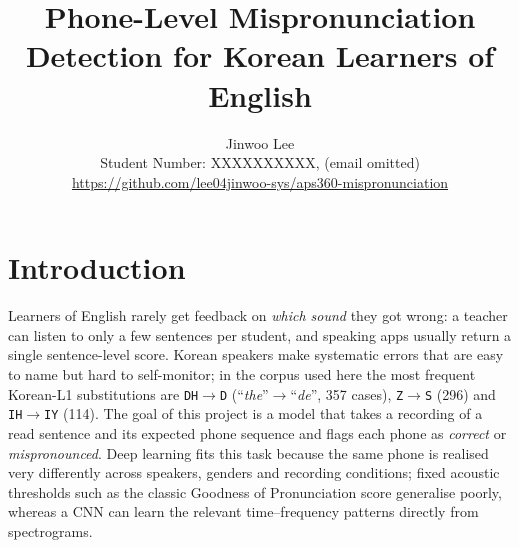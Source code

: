 \documentclass[final]{article}
\title{Phone-Level Mispronunciation Detection for Korean Learners of English}
\author{%
  Jinwoo Lee \\
  Student Number: XXXXXXXXXX, (email omitted)\\
  \url{https://github.com/lee04jinwoo-sys/aps360-mispronunciation}\\
}
\begin{document}
\maketitle

\vspace{-0.5in}


\section*{Introduction}
Learners of English rarely get feedback on \emph{which sound} they got wrong: a teacher can listen to only a few
sentences per student, and speaking apps usually return a single sentence-level score. Korean speakers make
systematic errors that are easy to name but hard to self-monitor; in the corpus used here the most frequent
Korean-L1 substitutions are \texttt{DH}$\rightarrow$\texttt{D} (``\emph{the}''$\rightarrow$``\emph{de}'', 357 cases),
\texttt{Z}$\rightarrow$\texttt{S} (296) and \texttt{IH}$\rightarrow$\texttt{IY} (114). The goal of this project is a model that takes a
recording of a read sentence and its expected phone sequence and flags each phone as
\emph{correct} or \emph{mispronounced}. Deep learning fits this task because the same phone is realised very
differently across speakers, genders and recording conditions; fixed acoustic thresholds such as the classic
Goodness of Pronunciation score \cite{witt2000phone} generalise poorly, whereas a CNN can learn the relevant
time--frequency patterns directly from spectrograms.
\end{document}
